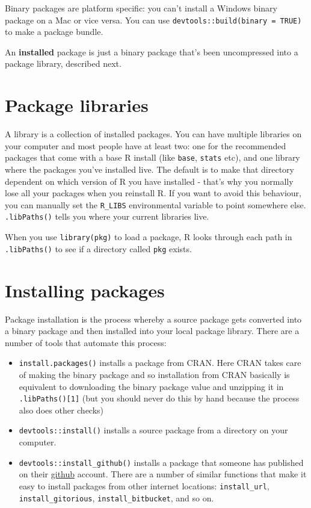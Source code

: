 Binary packages are platform specific: you can't install a Windows
binary package on a Mac or vice versa. You can use
\texttt{devtools::build(binary = TRUE)} to make a package bundle.

An \textbf{installed} package is just a binary package that's been
uncompressed into a package library, described next.

\section{Package libraries}

A library is a collection of installed packages. You can have multiple
libraries on your computer and most people have at least two: one for
the recommended packages that come with a base R install (like
\texttt{base}, \texttt{stats} etc), and one library where the packages
you've installed live. The default is to make that directory dependent
on which version of R you have installed - that's why you normally lose
all your packages when you reinstall R. If you want to avoid this
behaviour, you can manually set the \texttt{R\_LIBS} environmental
variable to point somewhere else. \texttt{.libPaths()} tells you where
your current libraries live.

When you use \texttt{library(pkg)} to load a package, R looks through
each path in \texttt{.libPaths()} to see if a directory called
\texttt{pkg} exists.

\section{Installing packages}

Package installation is the process whereby a source package gets
converted into a binary package and then installed into your local
package library. There are a number of tools that automate this process:

\begin{itemize}
\item
  \texttt{install.packages()} installs a package from CRAN. Here CRAN
  takes care of making the binary package and so installation from CRAN
  basically is equivalent to downloading the binary package value and
  unzipping it in \texttt{.libPaths(){[}1{]}} (but you should never do
  this by hand because the process also does other checks)
\item
  \texttt{devtools::install()} installs a source package from a
  directory on your computer.
\item
  \texttt{devtools::install\_github()} installs a package that someone
  has published on their \href{http://github}{github} account. There are
  a number of similar functions that make it easy to install packages
  from other internet locations: \texttt{install\_url},
  \texttt{install\_gitorious}, \texttt{install\_bitbucket}, and so on.
\end{itemize}

